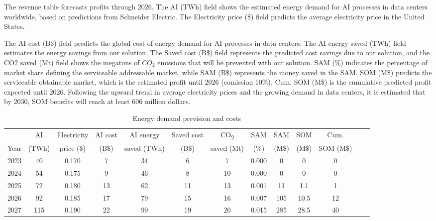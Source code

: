 The revenue table forecasts profits through 2026. The AI (TWh) field shows the estimated energy demand for AI processes in data centers worldwide, based on predictions from Schneider Electric. The Electricity price (\$) field predicts the average electricity price in the United States. 

The AI cost (B\$) field predicts the global cost of energy demand for AI processes in data centers. The AI energy saved (TWh) field estimates the energy savings from our solution. The Saved cost (B\$) field represents the predicted cost savings due to our solution, and the CO2 saved (Mt) field shows the megatons of $CO_2$ emissions that will be prevented with our solution. SAM (\%) indicates the percentage of market share defining the serviceable addressable market, while SAM (B\$) represents the money saved in the SAM. SOM (M\$) predicts the serviceable obtainable market, which is the estimated profit until 2026 (comission 10\%). Cum. SOM (M\$) is the cumulative predicted profit expected until 2026. Following the upward trend in average electricity prices and the growing demand in data centers, it is estimated that by 2030, SOM benefits will reach at least 606 million dollars.

\begin{table}[!h]
\footnotesize
\begin{tabular}{ccccccccccccc}
\toprule
 & AI & Electricity & AI cost & AI energy  & Saved cost & CO\textsubscript{2}  & SAM & SAM  & SOM  & Cum. \\
Year & (TWh) & price (\$) & (B\$) & saved (TWh) &  (B\$) & saved (Mt) & (\%) &   (M\$) & (M\$) & SOM (M\$) \\
\midrule
2023 & 40   & 0.170   & 7   & 34  & 6   & 7   & 0.000     & 0     & 0    & 0 \\
2024 & 54  & 0.175  & 9   & 46  & 8   & 10  & 0.000     & 0      & 0    & 0 \\
2025 & 72 & 0.180   & 13  & 62  & 11  & 13  & 0.001 & 11     & 1.1  & 1 \\
2026 & 92 & 0.185  & 17  & 79  & 15  & 16  & 0.007 & 105   & 10.5 & 12 \\
2027 & 115 & 0.190  & 22  & 99  & 19  & 20  & 0.015 & 285   & 28.5 & 40 \\
\bottomrule
\end{tabular}
\caption{Energy demand prevision and costs}
\end{table}

